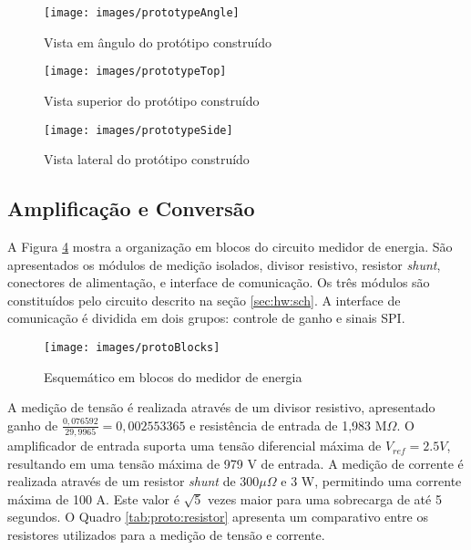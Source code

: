 		\begin{figure}
			\caption{Vista em ângulo do protótipo construído}
			\label{img:proto:angle}
			\texttt{[image: images/prototypeAngle]}
		\end{figure}

		\begin{figure}
			\caption{Vista superior do protótipo construído}
			\label{img:proto:top}
			\texttt{[image: images/prototypeTop]}
		\end{figure}

		\begin{figure}
			\caption{Vista lateral do protótipo construído}
			\label{img:proto:side}
			\texttt{[image: images/prototypeSide]}
		\end{figure}


		\subsection{Amplificação e Conversão}\label{sec:proto:struct:amp}

			A Figura \ref{img:proto:blocks} mostra a organização em blocos do circuito medidor de energia. São apresentados os módulos de medição isolados, divisor resistivo, resistor \textit{shunt}, conectores de alimentação, e interface de comunicação. Os três módulos são constituídos pelo circuito descrito na seção \ref{sec:hw:sch}. A interface de comunicação é dividida em dois grupos: controle de ganho e sinais SPI.

			\begin{figure}
				\caption{Esquemático em blocos do medidor de energia}
				\label{img:proto:blocks}
				\texttt{[image: images/protoBlocks]}
			\end{figure}

			A medição de tensão é realizada através de um divisor resistivo, apresentado ganho de $\frac{0,076592}{29,9965} = 0,002553365$ e resistência de entrada de 1,983 M$\Omega$. O amplificador de entrada suporta uma tensão diferencial máxima de $V_{ref} = 2.5 V$, resultando em uma tensão máxima de 979 V de entrada. A medição de corrente é realizada através de um resistor \textit{shunt} de $300 \mu\Omega$ e 3 W, permitindo uma corrente máxima de 100 A. Este valor é $\sqrt{5}$ vezes maior para uma sobrecarga de até 5 segundos. O Quadro \ref{tab:proto:resistor} apresenta um comparativo entre os resistores utilizados para a medição de tensão e corrente.

